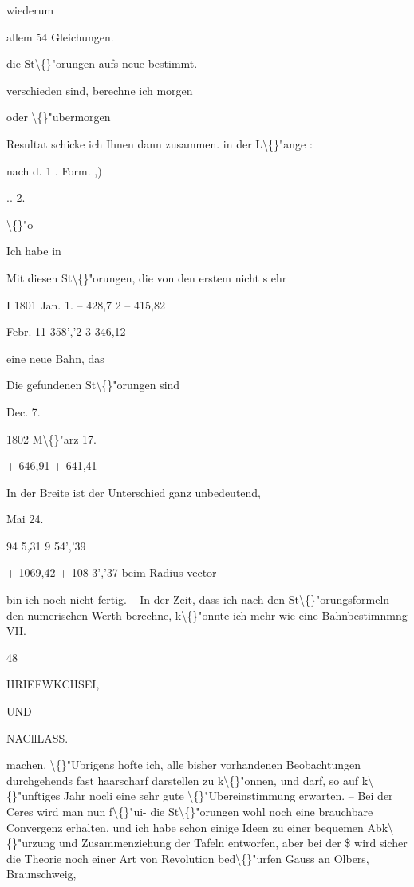 \documentclass[10pt,a4paper]{article}
\begin{document}
wiederum

allem 54 Gleichungen.

die St\textbackslash\{\}"orungen aufs neue bestimmt.

verschieden sind, berechne ich morgen

oder \textbackslash\{\}"ubermorgen

Resultat schicke ich Ihnen dann zusammen.
in der L\textbackslash\{\}"ange :

nach d. 1 . Form.
,)

.. 2.

\textbackslash\{\}"o

Ich habe in

Mit diesen St\textbackslash\{\}"orungen, die von den erstem nicht s ehr

I 1801 Jan. 1.
-- 428,7 2
-- 415,82

Febr. 11
358','2 3
346,12

eine neue Bahn, das

Die gefundenen St\textbackslash\{\}"orungen sind

Dec. 7.

1802 M\textbackslash\{\}"arz 17.

+ 646,91
+ 641,41

In der Breite ist der Unterschied ganz unbedeutend,

Mai 24.

94
5,31
9 54','39

+ 1069,42
+ 108 3','37
beim Radius vector

bin ich noch nicht fertig. -- In der Zeit, dass ich nach den St\textbackslash\{\}"orungsformeln
den numerischen Werth berechne, k\textbackslash\{\}"onnte ich mehr wie eine Bahnbestimnmng
VII.

48

\newpage

HRIEFWKCHSEI,

UND

NACllLASS.

machen. \textbackslash\{\}"Ubrigens hofte ich, alle bisher vorhandenen Beobachtungen durchgehends fast haarscharf darstellen zu k\textbackslash\{\}"onnen, und darf, so auf k\textbackslash\{\}"unftiges Jahr
nocli eine sehr gute \textbackslash\{\}"Ubereinstimmung erwarten. -- Bei der Ceres wird man
nun f\textbackslash\{\}"ui- die St\textbackslash\{\}"orungen wohl noch eine brauchbare Convergenz erhalten, und ich
habe schon einige Ideen zu einer bequemen Abk\textbackslash\{\}"urzung und Zusammenziehung
der Tafeln entworfen, aber bei der \$ wird sicher die Theorie noch einer Art
von Revolution bed\textbackslash\{\}"urfen
Gauss an Olbers, Braunschweig,
\end{document}

